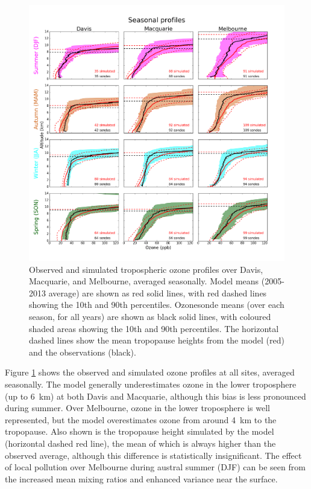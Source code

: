 \documentclass{article}
\begin{document}
  \begin{figure}[!htbp]
    \includegraphics[width=\textwidth]{figures/seasonalprofiles00.png}
    \caption{Observed and simulated tropospheric ozone profiles over Davis, Macquarie, and Melbourne, averaged seasonally.
    Model means (2005-2013 average) are shown as red solid lines, with red dashed lines showing the 10th and 90th percentiles.
    Ozonesonde means (over each season, for all years) are shown as black solid lines, with coloured shaded areas showing the 10th and 90th percentiles.
    The horizontal dashed lines show the mean tropopause heights from the model (red) and the observations (black).}
    \label{fig:GEOSChemSeasonalProfiles}
  \end{figure}
  
  Figure \ref{fig:GEOSChemSeasonalProfiles} shows the observed and simulated ozone profiles at all sites, averaged seasonally.
  The model generally underestimates ozone in the lower troposphere (up to 6~km) at both Davis and Macquarie, although this bias is less pronounced during summer.
  Over Melbourne, ozone in the lower troposphere is well represented, but the model overestimates ozone from around 4~km to the tropopause.
  Also shown is the tropopause height simulated by the model (horizontal dashed red line), the mean of which is always higher than the observed average, although this difference is statistically insignificant.
  The effect of local pollution over Melbourne during austral summer (DJF) can be seen from the increased mean mixing ratios and enhanced variance near the surface.
  
\end{document}
